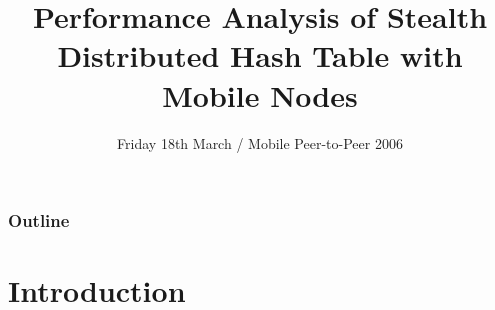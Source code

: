 \documentclass{beamer}
\title[Stealth DHT] %
{Performance Analysis of Stealth Distributed Hash Table with Mobile
Nodes}
\institute[Lancaster University, UK] %
{
  Andy MacQuire, \textbf{Andrew Brampton}, Idris A. Rai and Laurent Mathy\\
  \{macquire,brampton,rai,laurent\}@comp.lancs.ac.uk\\
  Computing Department\\
  Lancaster University, UK
}
\date[18th March 2006] %
{Friday 18th March / Mobile Peer-to-Peer 2006}
\begin{document}
\begin{frame}
  \titlepage
\end{frame}


\begin{frame}
  \frametitle{Outline}
  \tableofcontents
\end{frame}




\section{Introduction}

%
%
\end{document}
